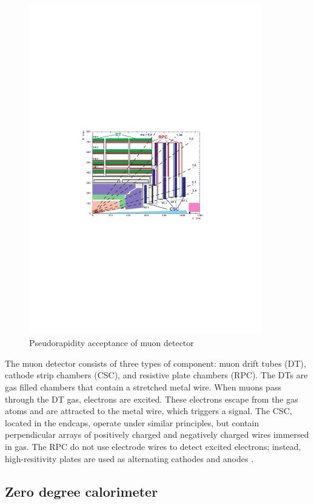 \begin{figure}[]
\begin{centering}
\includegraphics[width=4in]{Chapter3/importfigs/Figure_001-006.pdf}
\par\end{centering}
\caption{Pseudorapidity acceptance of muon detector \cite{Bayatian:2006nff}\label{fig:muonYZ}}
\end{figure}

The muon detector consists of three types of component: muon drift tubes (DT), cathode strip chambers (CSC), and resistive plate chambers (RPC). The DTs are gas filled chambers that contain a stretched metal wire. When muons pass through the DT gas, electrons are excited. These electrons escape from the gas atoms and are attracted to the metal wire, which triggers a signal. The CSC, located in the endcaps, operate under similar principles, but contain perpendicular arrays of positively charged and negatively charged wires immersed in gas. The RPC do not use electrode wires to detect excited electrons; instead, high-resitivity plates are used as alternating cathodes and anodes \cite{Albajar:2005wv}.

\subsection{Zero degree calorimeter}

